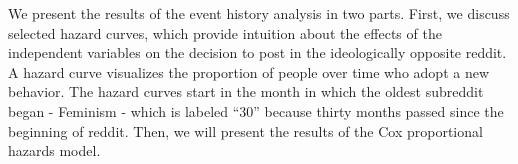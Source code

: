 \documentclass[letterpaper]{article}
\begin{document}
\begin{table}[htb]
    \centering
    \caption{Comment Variables and Descriptions}
    \label{tab:field_def}
\end{table}

We present the results of the event history analysis in two parts. First, we discuss selected hazard curves, which provide intuition about the effects of the independent variables on the decision to post in the ideologically opposite reddit. A hazard curve visualizes the proportion of people over time who adopt a new behavior. The hazard curves start in the month in which the oldest subreddit began - Feminism - which is labeled ``30'' because thirty months passed since the beginning of reddit. Then, we will present the results of the Cox proportional hazards model.
\end{document}
